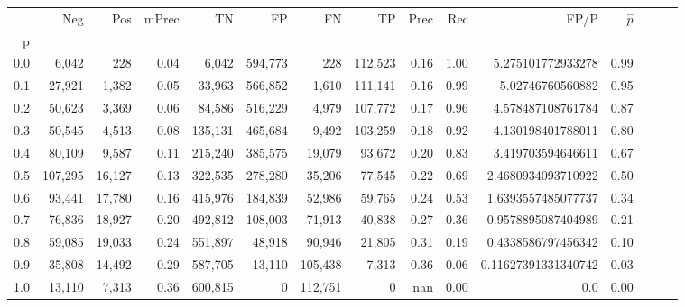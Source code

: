 \begin{tabular}{rrrrrrrrrrrrrrr}
\toprule
{} &      Neg &     Pos & mPrec &       TN &       FP &       FN &       TP &  Prec &   Rec &                 FP/P & $\hat{p}$ \\
p   &          &         &       &          &          &          &          &       &       &                      &           \\
\midrule
0.0 &    6,042 &     228 &  0.04 &    6,042 &  594,773 &      228 &  112,523 &  0.16 &  1.00 &    5.275101772933278 &      0.99 \\
0.1 &   27,921 &   1,382 &  0.05 &   33,963 &  566,852 &    1,610 &  111,141 &  0.16 &  0.99 &     5.02746760560882 &      0.95 \\
0.2 &   50,623 &   3,369 &  0.06 &   84,586 &  516,229 &    4,979 &  107,772 &  0.17 &  0.96 &    4.578487108761784 &      0.87 \\
0.3 &   50,545 &   4,513 &  0.08 &  135,131 &  465,684 &    9,492 &  103,259 &  0.18 &  0.92 &    4.130198401788011 &      0.80 \\
0.4 &   80,109 &   9,587 &  0.11 &  215,240 &  385,575 &   19,079 &   93,672 &  0.20 &  0.83 &    3.419703594646611 &      0.67 \\
0.5 &  107,295 &  16,127 &  0.13 &  322,535 &  278,280 &   35,206 &   77,545 &  0.22 &  0.69 &   2.4680934093710922 &      0.50 \\
0.6 &   93,441 &  17,780 &  0.16 &  415,976 &  184,839 &   52,986 &   59,765 &  0.24 &  0.53 &   1.6393557485077737 &      0.34 \\
0.7 &   76,836 &  18,927 &  0.20 &  492,812 &  108,003 &   71,913 &   40,838 &  0.27 &  0.36 &   0.9578895087404989 &      0.21 \\
0.8 &   59,085 &  19,033 &  0.24 &  551,897 &   48,918 &   90,946 &   21,805 &  0.31 &  0.19 &   0.4338586797456342 &      0.10 \\
0.9 &   35,808 &  14,492 &  0.29 &  587,705 &   13,110 &  105,438 &    7,313 &  0.36 &  0.06 &  0.11627391331340742 &      0.03 \\
1.0 &   13,110 &   7,313 &  0.36 &  600,815 &        0 &  112,751 &        0 &   nan &  0.00 &                  0.0 &      0.00 \\
\bottomrule
\end{tabular}
